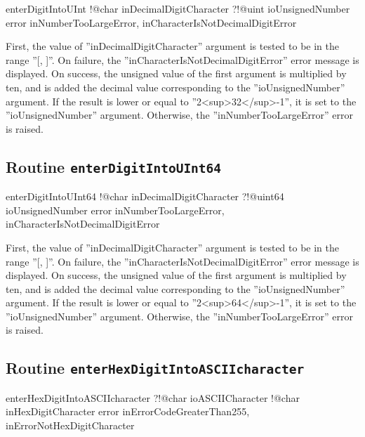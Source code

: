 \begin{galgas3}
enterDigitIntoUInt !@char inDecimalDigitCharacter
                   ?!@uint ioUnsignedNumber
                   error inNumberTooLargeError,
                         inCharacterIsNotDecimalDigitError
\end{galgas3}

First, the value of ''inDecimalDigitCharacter'' argument is tested to be in the range ''[\textquotesingle, \textquotesingle]''. On failure, the ''inCharacterIsNotDecimalDigitError'' error message is displayed. On success, the unsigned value of the first argument is multiplied by ten, and is added the decimal value corresponding to the ''ioUnsignedNumber'' argument. If the result is lower or equal to ''2<sup>32</sup>-1'', it is set to the ''ioUnsignedNumber'' argument. Otherwise, the ''inNumberTooLargeError'' error is raised.

\subsection{Routine \texttt{enterDigitIntoUInt64}}

\begin{galgas3}
enterDigitIntoUInt64 !@char inDecimalDigitCharacter
                     ?!@uint64 ioUnsignedNumber
                     error inNumberTooLargeError,
                           inCharacterIsNotDecimalDigitError
\end{galgas3}

First, the value of ''inDecimalDigitCharacter'' argument is tested to be in the range ''[\textquotesingle, \textquotesingle]''. On failure, the ''inCharacterIsNotDecimalDigitError'' error message is displayed. On success, the unsigned value of the first argument is multiplied by ten, and is added the decimal value corresponding to the ''ioUnsignedNumber'' argument. If the result is lower or equal to ''2<sup>64</sup>-1'', it is set to the ''ioUnsignedNumber'' argument. Otherwise, the ''inNumberTooLargeError'' error is raised.

\subsection{Routine \texttt{enterHexDigitIntoASCIIcharacter}}

\begin{galgas3}
enterHexDigitIntoASCIIcharacter ?!@char ioASCIICharacter
                                !@char inHexDigitCharacter
                                error inErrorCodeGreaterThan255,
                                      inErrorNotHexDigitCharacter
\end{galgas3}

